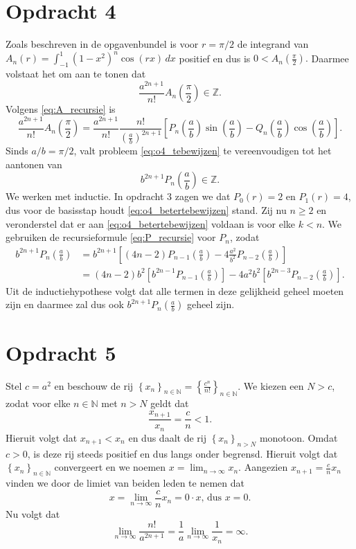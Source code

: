 \documentclass[12pt,a4paper]{article}
\theoremstyle{definition}
\numberwithin{equation}{section}
\begin{document}
\section*{Opdracht 4}
Zoals beschreven in de opgavenbundel is voor $r=\pi/2$ de integrand van $A_n(r) = \int_{-1}^{1}\left(1-x^2\right)^n\cos\left(rx\right)\,dx$ positief en dus is $0<A_n\left(\frac{\pi}{2}\right).$ 
Daarmee volstaat het om aan te tonen dat 
\begin{equation}
  \frac{a^{2n+1}}{n!}A_n\left(\frac{\pi}{2}\right)\in\mathbb{Z}.\label{eq:o4_tebewijzen}
\end{equation} 
Volgens \eqref{eq:A_recursie} is 
$$    \frac{a^{2n+1}}{n!}A_n\left(\frac{\pi}{2}\right) =\frac{a^{2n+1}}{n!}\frac{n!}{\left(\frac{a}{b}\right)^{2n+1}}\left[P_n\left(\frac{a}{b}\right)\sin{\left(\frac{a}{b}\right)}-Q_n\left(\frac{a}{b}\right)\cos{\left(\frac{a}{b}\right)}\right].$$
    Sinds $a/b = \pi/2$, valt probleem \eqref{eq:o4_tebewijzen} te vereenvoudigen tot het aantonen van
   \begin{equation}
       b^{2n+1}P_n\left(\frac{a}{b}\right)\in\mathbb{Z}. 
       \label{eq:o4_betertebewijzen}
   \end{equation}
We werken met inductie. In opdracht 3 zagen we dat $P_0(r) = 2$ en $P_1(r) =4$, dus voor de basisstap houdt \eqref{eq:o4_betertebewijzen} stand. 
Zij nu $n\geq 2$ en veronderstel dat er aan \eqref{eq:o4_betertebewijzen} voldaan is voor elke $k<n$. 
We gebruiken de recursieformule \eqref{eq:P_recursie} voor $P_n$, zodat
\begin{align*}
     b^{2n+1}P_n\left(\frac{a}{b}\right)&=b^{2n+1}\left[\left(4n-2\right)P_{n-1}\left(\frac{a}{b}\right)-4\frac{a^2}{b^2}P_{n-2}\left(\frac{a}{b}\right)\right]\\
               &=\left(4n-2\right)b^2\left[b^{2n-1}P_{n-1}\left(\frac{a}{b}\right)\right] - 4a^2b^2\left[b^{2n-3}P_{n-2}\left(\frac{a}{b}\right)\right].
\end{align*}
Uit de inductiehypothese volgt dat alle termen in deze gelijkheid geheel moeten zijn en daarmee zal dus ook $b^{2n+1}P_n\left(\frac{a}{b}\right)$ geheel zijn.


\section*{Opdracht 5}
Stel $c=a^2$ en beschouw de rij $\left\{x_n\right\}_{n\in\mathbb{N}}=\left\{\frac{c^{n}}{n!}\right\}_{n\in\mathbb{N}}$. We kiezen een $N>c$, zodat voor elke $n\in\mathbb{N}$ met $n>N$ geldt dat
$$\frac{x_{n+1}}{x_n}=\frac{c}{n}<1.$$ Hieruit volgt dat $x_{n+1}<x_n$ en dus daalt de rij $\left\{x_n\right\}_{n>N}$ monotoon. Omdat $c>0$, is deze rij steeds positief en dus langs onder begrensd. 
Hieruit volgt dat $\left\{x_n\right\}_{n\in\mathbb{N}}$ convergeert en we noemen $x=\lim_{n\to\infty}x_n$. 
Aangezien $x_{n+1}=\frac{c}{n}x_n$ vinden we door de limiet van beiden leden te nemen dat 
$$ x = \lim_{n\to\infty} \frac{c}{n} x_n= 0\cdot x\text{, dus } x=0.$$
Nu volgt dat
$$\lim_{n\to\infty}\frac{n!}{a^{2n+1}}=\frac{1}{a}\lim_{n\to\infty}\frac{1}{x_n}=\infty.$$
\end{document}

